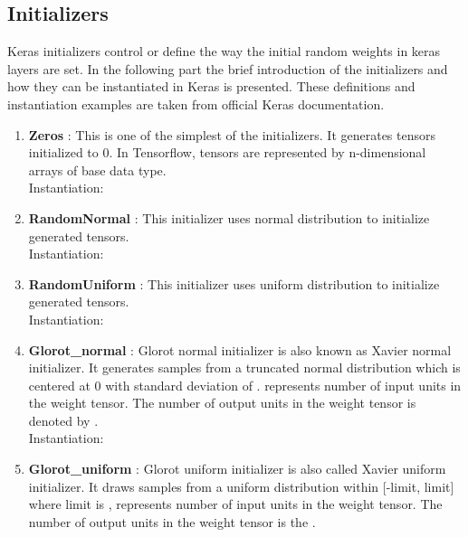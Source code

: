 
\subsection{Initializers}
Keras initializers \cite{kerasinit} control or define the way the initial random weights in keras layers are set.
In the following part the brief introduction of the initializers and how they can be instantiated in Keras is presented. These definitions and instantiation examples are taken from official Keras \cite{kerasinit} documentation.

\begin{enumerate}
 \item \textbf{Zeros} : This is one of the simplest of the initializers. It generates tensors initialized to 0. In Tensorflow, tensors are represented by n-dimensional arrays of base data type.\\
Instantiation: 
 \item \textbf{RandomNormal} : This initializer uses normal distribution to initialize generated tensors.\\
Instantiation: 
\item \textbf{RandomUniform} : This initializer uses uniform distribution to initialize generated tensors.\\
Instantiation: \\
 \item \textbf{Glorot\_normal} : Glorot normal initializer is also known as Xavier normal initializer. It generates samples from a truncated normal distribution which is centered at 0 with 
standard deviation of .  represents number of input units in the weight tensor. The number of output units in the weight tensor is denoted by .\\
Instantiation: 
 \item \textbf{Glorot\_uniform} : Glorot uniform initializer is also called Xavier uniform initializer. It draws samples from a uniform distribution within [-limit, limit] 
where limit is ,  represents number of input units in the weight tensor. The number of output units in the weight tensor is the .\\

\end{enumerate}
